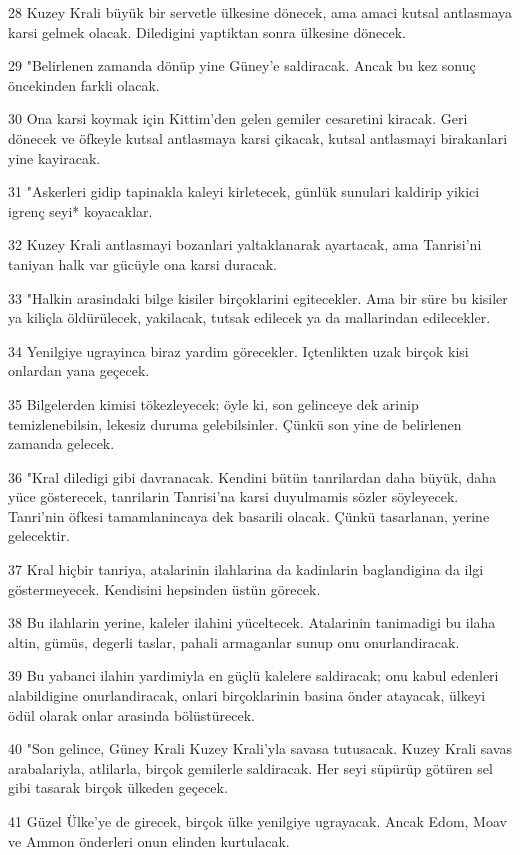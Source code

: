 \par 28 Kuzey Krali büyük bir servetle ülkesine dönecek, ama amaci kutsal antlasmaya karsi gelmek olacak. Diledigini yaptiktan sonra ülkesine dönecek.
\par 29 "Belirlenen zamanda dönüp yine Güney'e saldiracak. Ancak bu kez sonuç öncekinden farkli olacak.
\par 30 Ona karsi koymak için Kittim'den gelen gemiler cesaretini kiracak. Geri dönecek ve öfkeyle kutsal antlasmaya karsi çikacak, kutsal antlasmayi birakanlari yine kayiracak.
\par 31 "Askerleri gidip tapinakla kaleyi kirletecek, günlük sunulari kaldirip yikici igrenç seyi* koyacaklar.
\par 32 Kuzey Krali antlasmayi bozanlari yaltaklanarak ayartacak, ama Tanrisi'ni taniyan halk var gücüyle ona karsi duracak.
\par 33 "Halkin arasindaki bilge kisiler birçoklarini egitecekler. Ama bir süre bu kisiler ya kiliçla öldürülecek, yakilacak, tutsak edilecek ya da mallarindan edilecekler.
\par 34 Yenilgiye ugrayinca biraz yardim görecekler. Içtenlikten uzak birçok kisi onlardan yana geçecek.
\par 35 Bilgelerden kimisi tökezleyecek; öyle ki, son gelinceye dek arinip temizlenebilsin, lekesiz duruma gelebilsinler. Çünkü son yine de belirlenen zamanda gelecek.
\par 36 "Kral diledigi gibi davranacak. Kendini bütün tanrilardan daha büyük, daha yüce gösterecek, tanrilarin Tanrisi'na karsi duyulmamis sözler söyleyecek. Tanri'nin öfkesi tamamlanincaya dek basarili olacak. Çünkü tasarlanan, yerine gelecektir.
\par 37 Kral hiçbir tanriya, atalarinin ilahlarina da kadinlarin baglandigina da ilgi göstermeyecek. Kendisini hepsinden üstün görecek.
\par 38 Bu ilahlarin yerine, kaleler ilahini yüceltecek. Atalarinin tanimadigi bu ilaha altin, gümüs, degerli taslar, pahali armaganlar sunup onu onurlandiracak.
\par 39 Bu yabanci ilahin yardimiyla en güçlü kalelere saldiracak; onu kabul edenleri alabildigine onurlandiracak, onlari birçoklarinin basina önder atayacak, ülkeyi ödül olarak onlar arasinda bölüstürecek.
\par 40 "Son gelince, Güney Krali Kuzey Krali'yla savasa tutusacak. Kuzey Krali savas arabalariyla, atlilarla, birçok gemilerle saldiracak. Her seyi süpürüp götüren sel gibi tasarak birçok ülkeden geçecek.
\par 41 Güzel Ülke'ye de girecek, birçok ülke yenilgiye ugrayacak. Ancak Edom, Moav ve Ammon önderleri onun elinden kurtulacak.
